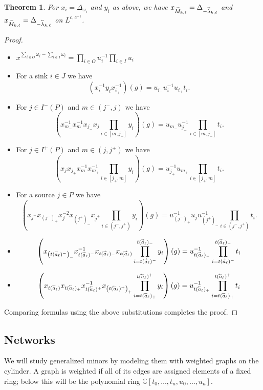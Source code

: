 \documentclass[11pt]{amsart}
\newcommand{\CC}{\mathbb{C}}
\renewcommand{\vec}[1]{\accentset{\shortrightarrow}{#1}}
\newcommand{\cev}[1]{\accentset{\shortleftarrow}{#1}}
\newtheorem{theorem}{Theorem}[section]
\numberwithin{equation}{section}
\begin{document}
  \begin{theorem}
    For $x_i=\Delta_{\omega_i}$ and $y_i$ as above, we have $x_{\vec{M}_{k,\ell}}=\Delta_{-\vec{\lambda}_{k,\ell}}$ and $x_{\cev{M}_{k,\ell}}=\Delta_{-\cev{\lambda}_{k,\ell}}$ on $L^{c,c^{-1}}$.
  \end{theorem}
  \begin{proof}\mbox{}
    \begin{itemize}
      \item $x^{\sum_{i\in O}\omega_i-\sum_{i\in I}\omega_i}=\prod\limits_{i\in O}u_i^{-1}\prod\limits_{i\in I}u_i$
      \item For a sink $i\in J$ we have
      \[\left(x_{i_-}^{-1}y_ix_{i_+}^{-1}\right)(g)=u_{i_-}u_i^{-1}u_{i_+}t_i.\]
      \item For $j\in I^-(P)$ and $m\in(j^-,j)$ we have
      \[\left(x_{m_-}^{-1}x_m^{-1}x_{j_-}x_j\prod\limits_{i\in[m,j_-]}y_i\right)(g)=u_{m_-}u_{j_-}^{-1}\prod\limits_{i\in[m,j_-]}t_i.\]
      \item For $j\in I^+(P)$ and $m\in(j,j^+)$ we have
      \[\left(x_jx_{j_+}x_m^{-1}x_{m_+}^{-1}\prod\limits_{i\in[j_+,m]}y_i\right)(g)=u_{j_+}^{-1}u_{m_+}\prod\limits_{i\in[j_+,m]}t_i.\]
      \item For a source $j\in P$ we have
      \[\left(x_{j^-}x_{(j^-)_+}x_j^{-2}x_{(j^+)_-}x_{j^+}\prod\limits_{i\in(j^-,j^+)}y_i\right)(g)=u_{(j^-)_+}^{-1}u_ju_{(j^+)_-}^{-1}\prod\limits_{i\in(j^-,j^+)}t_i.\]
      \item 
      \[\left(x_{\left(t(\vec{a}_\ell)^-\right)_-}x_{t(\vec{a}_\ell)^-}^{-1}x_{t(\vec{a}_\ell)_-}x_{t(\vec{a}_\ell)}\prod_{i=t(\vec{a}_\ell)^-}^{t(\vec{a}_\ell)_-}y_i\right)(g)=u_{t(\vec{a}_\ell)_-}^{-1}\prod_{i=t(\vec{a}_\ell)^-}^{t(\vec{a}_\ell)_-}t_i\]
      \item
      \[\left(x_{t(\cev{a}_\ell)}x_{t(\cev{a}_\ell)_+}x_{t(\cev{a}_\ell)^+}^{-1}x_{\left(t(\cev{a}_\ell)^+\right)_+}\prod_{i=t(\cev{a}_\ell)_+}^{t(\cev{a}_\ell)^+}y_i\right)(g)=u_{t(\cev{a}_\ell)_+}^{-1}\prod_{i=t(\cev{a}_\ell)_+}^{t(\cev{a}_\ell)^+}t_i\]
    \end{itemize}
    Comparing formulas using the above substitutions completes the proof.
  \end{proof}

\subsection{Networks}

We will study generalized minors by modeling them with weighted graphs on the cylinder. A graph is weighted if all of its edges are assigned elements of a fixed ring; below this will be the polynomial ring $\CC[t_0,\dotsc,t_n,u_0,\dotsc,u_n]$.
\end{document}
